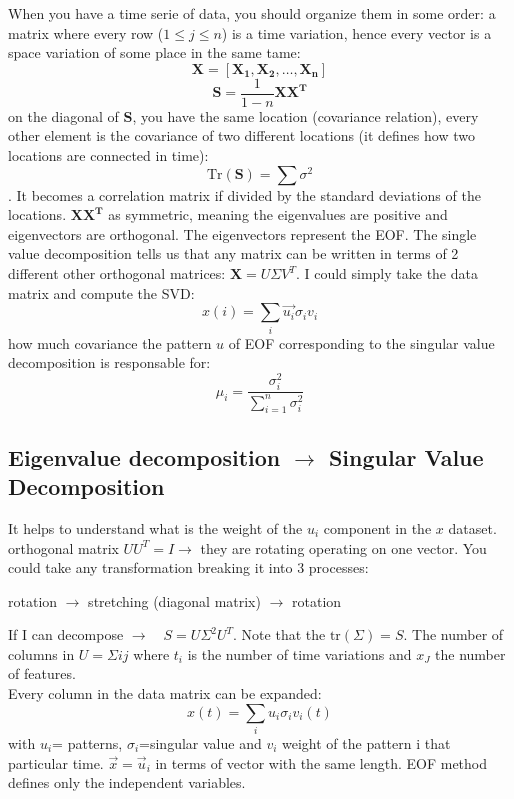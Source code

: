 When you have a time serie of data, you should organize them in some order: a matrix where every row ($1\leq j\leq n$) is a time variation, hence every vector is a space variation of some place in the same tame:
$$\mathbf{X}=\left[\mathbf{X_1, X_2,\dots, X_n} \right]$$
$$\mathbf{S}=\frac{1}
{1-n}\mathbf{X}\mathbf{X^T}$$
on the diagonal of $\mathbf{S}$, you have the same location (covariance relation), every other element is the covariance of two different locations (it defines how two locations are connected in time): $$\text{Tr}(\mathbf{S})=\sum\sigma^2$$. It becomes a correlation matrix if divided by the standard deviations of the locations. $\mathbf{XX^T}$ as symmetric, meaning the eigenvalues are positive and eigenvectors are orthogonal. The eigenvectors represent the EOF. The single value decomposition tells us that any matrix can be written in terms of 2 different other orthogonal matrices: $\mathbf{X}=U\Sigma V^T$. I could simply take the data matrix and compute the SVD: 
$$x(i)=\sum_i\vec{u_i}\sigma_iv_i$$
how much covariance the pattern $u$ of EOF corresponding to the singular value decomposition  is responsable for: 
$$\mu_i=\frac{\sigma_i^2}{\displaystyle\sum_{i=1}^{n}\sigma_i^2}$$
\subsection{Eigenvalue decomposition $\rightarrow$ Singular Value Decomposition}
It helps to understand what is the weight of the $u_i$ component in the $x$ dataset.
\\


orthogonal matrix $UU^T=I\rightarrow$ they are rotating operating on one vector. You could take any transformation breaking it into 3 processes:
\begin{center}
    rotation $\rightarrow$ stretching (diagonal matrix) $\rightarrow$ rotation
\end{center}
If I can decompose $\rightarrow \quad S=U\Sigma^2U^T$. Note that the $\text{tr}(\Sigma)=S$. The number of columns in $U=\Sigma ij$ where $t_i$ is the number of time variations and $x_J$ the number of features. 
\\


Every column in the data matrix can be expanded: 
\begin{equation*}
    x(t)=\sum_iu_i\sigma_iv_i(t)
\end{equation*}
with $u_i$= patterns, $\sigma_i$=singular value and $v_i$ weight of the pattern i that particular time. $\vec{x}=\vec{u}_i$ in terms of vector with the same length. EOF method defines only the independent variables. 

